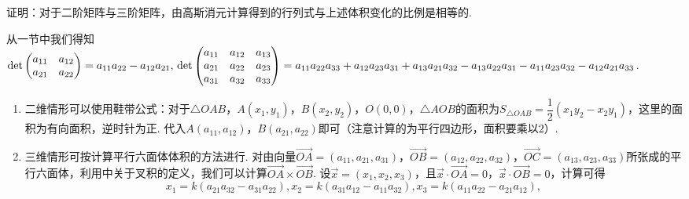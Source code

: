 \begin{exercise}

    \begin{exgroup}
        \item 证明：对于二阶矩阵与三阶矩阵，由高斯消元计算得到的行列式与上述体积变化的比例是相等的.
        \begin{answer}
            从一节中我们得知
                $\det\begin{pmatrix}
                    a_{11} & a_{12} \\
                    a_{21} & a_{22}
                \end{pmatrix} = a_{11}a_{22} - a_{12}a_{21}, \\
                \det\begin{pmatrix}
                    a_{11} & a_{12} & a_{13} \\
                    a_{21} & a_{22} & a_{23} \\
                    a_{31} & a_{32} & a_{33}
                \end{pmatrix} = a_{11}a_{22}a_{33} + a_{12}a_{23}a_{31} + a_{13}a_{21}a_{32} - a_{13}a_{22}a_{31} - a_{11}a_{23}a_{32} - a_{12}a_{21}a_{33}$.
            \begin{enumerate}
                \item 二维情形可以使用鞋带公式：对于$\triangle OAB$，$A(x_1,y_1)$，$B(x_2,y_2)$，$O(0,0)$，$\triangle AOB$的面积为$S_{\triangle OAB}=\dfrac{1}{2}(x_1y_2-x_2y_1)$，这里的面积为有向面积，逆时针为正. 代入$A(a_{11}, a_{12})$，$B(a_{21}, a_{22})$即可（注意计算的为平行四边形，面积要乘以$2$）.
                \item 三维情形可按计算平行六面体体积的方法进行. 对由向量$\overrightarrow{OA}=(a_{11},a_{21},a_{31})$，$\overrightarrow{OB}=(a_{12},a_{22},a_{32})$，$\overrightarrow{OC}=(a_{13},a_{23},a_{33})$所张成的平行六面体，利用中关于叉积的定义，我们可以计算$\overrightarrow{OA}\times\overrightarrow{OB}$. 设$\vec{x}=(x_1,x_2,x_3)$，且$\vec{x}\cdot\overrightarrow{OA}=0$，$\vec{x}\cdot\overrightarrow{OB}=0$，计算可得\[x_1=k(a_{21}a_{32}-a_{31}a_{22}), x_2=k(a_{31}a_{12}-a_{11}a_{32}), x_3=k(a_{11}a_{22}-a_{21}a_{12}),\]


\end{enumerate}
\end{answer}
\end{exgroup}
\end{exercise}
